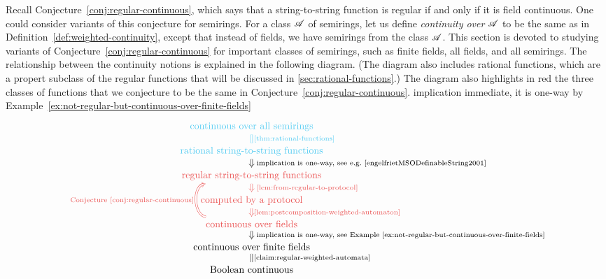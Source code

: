   Recall Conjecture~\ref{conj:regular-continuous}, which says that a string-to-string function is regular if and only if it is field continuous. One could consider variants of this conjecture for semirings.  For a class $\mathscr A$ of semirings, let us define \emph{continuity over $\mathscr A$} to be the same as in Definition~\ref{def:weighted-continuity}, except that instead of fields, we have semirings from the class $\mathscr A$. This section is devoted to studying   variants of Conjecture~\ref{conj:regular-continuous} for  important classes of semirings, such as finite fields, all fields,  and all semirings. The relationship between the continuity notions is explained in the following diagram. (The diagram also includes rational functions, which are a propert subclass of the regular functions that will be discussed in \cref{sec:rational-functions}.) The diagram also highlights in red the three classes of functions that we conjecture to be the same in Conjecture~\ref{conj:regular-continuous}.
implication immediate, it is one-way by Example~\ref{ex:not-regular-but-continuous-over-finite-fields}
\[
\begin{tikzcd}[row sep=small]
 \text{\blue{continuous over all semirings}}
\arrow[d,blue, equal,"\text{\cref{thm:rational-functions}}"]
\\
 \text{\blue{rational string-to-string functions}}
\ar[d,Rightarrow,"\text{ implication is one-way,  see e.g.~\cite[p. 218]{engelfrietMSODefinableString2001}}"]
\\
 \text{\red{regular string-to-string functions}}
\ar[d,red,Rightarrow,"\text{ \cref{lem:from-regular-to-protocol}}"]
\\
% 
 \text{\red{computed by a protocol}}
\ar[d,red,Rightarrow,"\text{\cref{lem:postcomposition-weighted-automaton}}"]
\\
 \text{\red{continuous over fields}}
\ar[uu, red, bend left=80,Rightarrow,"\text{ Conjecture~\ref{conj:regular-continuous}}"]
\ar[d,Rightarrow,"\text{ implication is one-way, see Example~\ref{ex:not-regular-but-continuous-over-finite-fields}}"]
\\
 \text{continuous over finite fields}
\arrow[d,equal,"\text{\cref{claim:regular-weighted-automata}}"]
\\
 \text{Boolean continuous}
\end{tikzcd}
\]

